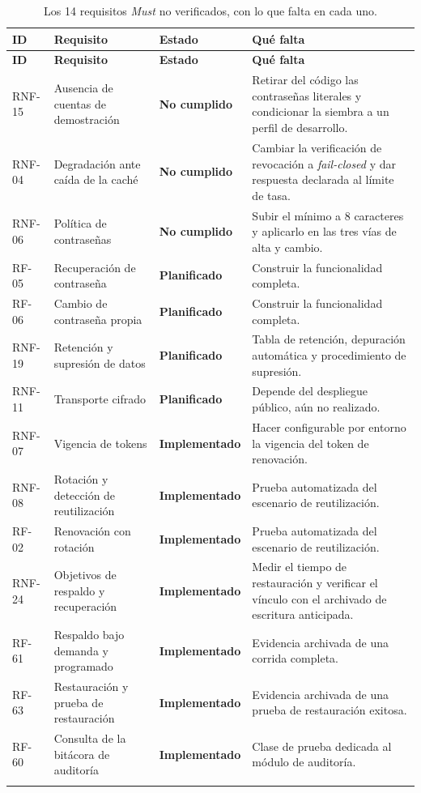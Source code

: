 \documentclass[11pt,a4paper]{article}
\newcommand{\estadoI}{\textcolor{ambar}{\textbf{Implementado}}}
\newcommand{\estadoP}{\textcolor{grisln}{\textbf{Planificado}}}
\newcommand{\estadoN}{\textcolor{rojoko}{\textbf{No cumplido}}}
\begin{document}
\begin{longtable}{p{1.6cm} p{5.3cm} p{2.9cm} p{4.6cm}}
\toprule
\textbf{ID} & \textbf{Requisito} & \textbf{Estado} & \textbf{Qué falta} \\
\midrule
\endfirsthead
\toprule
\textbf{ID} & \textbf{Requisito} & \textbf{Estado} & \textbf{Qué falta} \\
\midrule
\endhead
RNF-15 & Ausencia de cuentas de demostración & \estadoN & Retirar del código las contraseñas
literales y condicionar la siembra a un perfil de desarrollo. \\
RNF-04 & Degradación ante caída de la caché & \estadoN & Cambiar la verificación de revocación a
\emph{fail-closed} y dar respuesta declarada al límite de tasa. \\
RNF-06 & Política de contraseñas & \estadoN & Subir el mínimo a 8 caracteres y aplicarlo en las
tres vías de alta y cambio. \\
RF-05 & Recuperación de contraseña & \estadoP & Construir la funcionalidad completa. \\
RF-06 & Cambio de contraseña propia & \estadoP & Construir la funcionalidad completa. \\
RNF-19 & Retención y supresión de datos & \estadoP & Tabla de retención, depuración automática y
procedimiento de supresión. \\
RNF-11 & Transporte cifrado & \estadoP & Depende del despliegue público, aún no realizado. \\
RNF-07 & Vigencia de tokens & \estadoI & Hacer configurable por entorno la vigencia del token de
renovación. \\
RNF-08 & Rotación y detección de reutilización & \estadoI & Prueba automatizada del escenario de
reutilización. \\
RF-02 & Renovación con rotación & \estadoI & Prueba automatizada del escenario de reutilización. \\
RNF-24 & Objetivos de respaldo y recuperación & \estadoI & Medir el tiempo de restauración y
verificar el vínculo con el archivado de escritura anticipada. \\
RF-61 & Respaldo bajo demanda y programado & \estadoI & Evidencia archivada de una corrida
completa. \\
RF-63 & Restauración y prueba de restauración & \estadoI & Evidencia archivada de una prueba de
restauración exitosa. \\
RF-60 & Consulta de la bitácora de auditoría & \estadoI & Clase de prueba dedicada al módulo de
auditoría. \\
\bottomrule
\caption{Los 14 requisitos \emph{Must} no verificados, con lo que falta en cada uno.}
\end{longtable}
\end{document}

